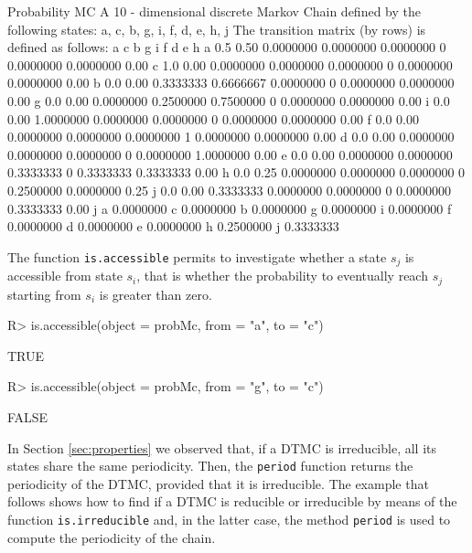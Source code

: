 \documentclass[
  nojss]{jss}
\begin{document}
\begin{CodeChunk}
\begin{CodeOutput}
Probability MC 
 A  10 - dimensional discrete Markov Chain defined by the following states: 
 a, c, b, g, i, f, d, e, h, j 
 The transition matrix  (by rows)  is defined as follows: 
    a    c         b         g         i f         d         e    h
a 0.5 0.50 0.0000000 0.0000000 0.0000000 0 0.0000000 0.0000000 0.00
c 1.0 0.00 0.0000000 0.0000000 0.0000000 0 0.0000000 0.0000000 0.00
b 0.0 0.00 0.3333333 0.6666667 0.0000000 0 0.0000000 0.0000000 0.00
g 0.0 0.00 0.0000000 0.2500000 0.7500000 0 0.0000000 0.0000000 0.00
i 0.0 0.00 1.0000000 0.0000000 0.0000000 0 0.0000000 0.0000000 0.00
f 0.0 0.00 0.0000000 0.0000000 0.0000000 1 0.0000000 0.0000000 0.00
d 0.0 0.00 0.0000000 0.0000000 0.0000000 0 0.0000000 1.0000000 0.00
e 0.0 0.00 0.0000000 0.0000000 0.3333333 0 0.3333333 0.3333333 0.00
h 0.0 0.25 0.0000000 0.0000000 0.0000000 0 0.2500000 0.0000000 0.25
j 0.0 0.00 0.3333333 0.0000000 0.0000000 0 0.0000000 0.3333333 0.00
          j
a 0.0000000
c 0.0000000
b 0.0000000
g 0.0000000
i 0.0000000
f 0.0000000
d 0.0000000
e 0.0000000
h 0.2500000
j 0.3333333
\end{CodeOutput}
\end{CodeChunk}

The function \texttt{is.accessible} permits to investigate whether a state \(s_{j}\) is accessible from state \(s_i\), that is whether the probability to eventually reach \(s_j\) starting from \(s_{i}\) is greater than zero.

\begin{CodeChunk}

\begin{CodeInput}
R> is.accessible(object = probMc, from = "a", to = "c")
\end{CodeInput}

\begin{CodeOutput}
[1] TRUE
\end{CodeOutput}

\begin{CodeInput}
R> is.accessible(object = probMc, from = "g", to = "c")
\end{CodeInput}

\begin{CodeOutput}
[1] FALSE
\end{CodeOutput}
\end{CodeChunk}

In Section \ref{sec:properties} we observed that, if a DTMC is irreducible, all its states share the same periodicity. Then, the \texttt{period} function returns the periodicity of the DTMC, provided that it is irreducible. The example that follows shows how to find if a DTMC is reducible or irreducible by means of the function \texttt{is.irreducible} and, in the latter case, the method \texttt{period} is used to compute the periodicity of the chain.
\end{document}
